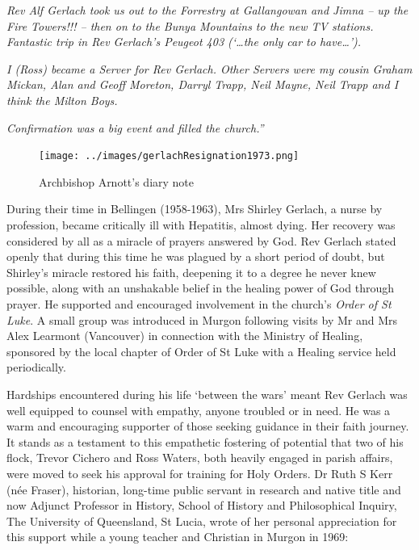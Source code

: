 \smallskip


\emph{Rev Alf Gerlach took us out to the Forrestry at Gallangowan and Jimna -- up the Fire Towers!!! -- then on to the Bunya Mountains to the new TV stations. Fantastic trip in Rev Gerlach's Peugeot 403 (`\ldots the only car to have\ldots').}



\smallskip


\emph{I (Ross) became a Server for Rev Gerlach. Other Servers were my cousin Graham Mickan, Alan and Geoff Moreton, Darryl Trapp, Neil Mayne, Neil Trapp and I think the Milton Boys.}



\smallskip


\emph{Confirmation was a big event and filled the church.''}



\medskip








\begin{figure}[!htb]
\begin{center}
\texttt{[image: ../images/gerlachResignation1973.png]}
\caption{Archbishop Arnott's diary note}
\end{center}
\end{figure}




During their time in Bellingen (1958-1963), Mrs Shirley Gerlach, a nurse by profession, became critically ill with Hepatitis, almost dying. Her recovery was considered by all as a miracle of prayers answered by God. Rev Gerlach stated openly that during this time he was plagued by a short period of doubt, but Shirley's miracle restored his faith, deepening it to a degree he never knew possible, along with an unshakable belief in the healing power of God through prayer. He supported and encouraged involvement in the church's \emph{Order of St Luke}. A small group was introduced in Murgon following visits by Mr and Mrs Alex Learmont (Vancouver) in connection with the Ministry of Healing, sponsored by the local chapter of Order of St Luke with a Healing service held periodically.



Hardships encountered during his life `between the wars' meant Rev Gerlach was well equipped to counsel with empathy, anyone troubled or in need. He was a warm and encouraging supporter of those seeking guidance in their faith journey. It stands as a testament to this empathetic fostering of potential that two of his flock, Trevor Cichero and Ross Waters, both heavily engaged in parish affairs, were moved to seek his approval for training for Holy Orders. Dr Ruth S Kerr (née Fraser), historian, long-time public servant in research and native title and now Adjunct Professor in History, School of History and Philosophical Inquiry, The University of Queensland, St Lucia, wrote of her personal appreciation for this support while a young teacher and Christian in Murgon in 1969:



